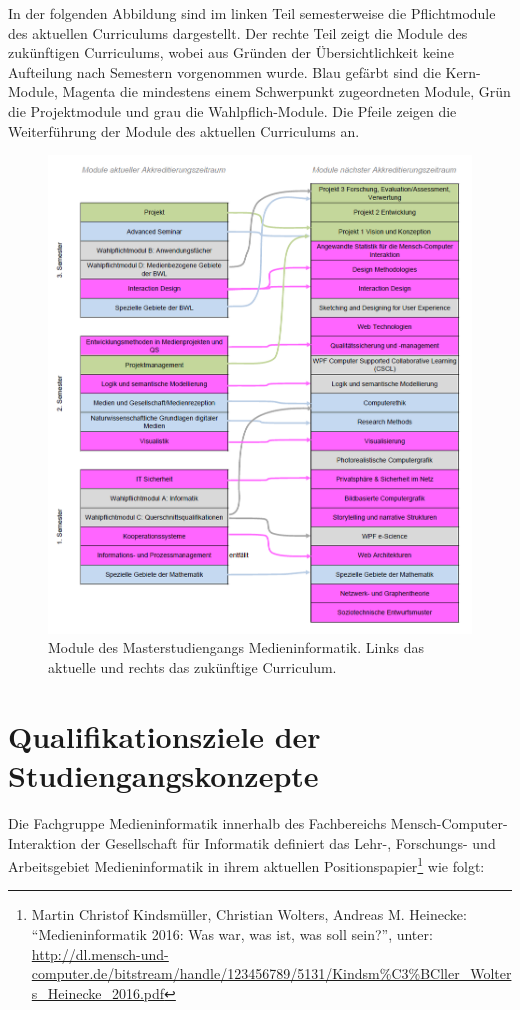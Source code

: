 In der folgenden Abbildung sind im linken Teil semesterweise die
Pflichtmodule des aktuellen Curriculums dargestellt. Der rechte Teil
zeigt die Module des zukünftigen Curriculums, wobei aus Gründen der
Übersichtlichkeit keine Aufteilung nach Semestern vorgenommen wurde.
Blau gefärbt sind die Kern-Module, Magenta die mindestens einem
Schwerpunkt zugeordneten Module, Grün die Projektmodule und grau die
Wahlpflich-Module. Die Pfeile zeigen die Weiterführung der Module des
aktuellen Curriculums an.

\begin{figure}[htbp]
\centering
\includegraphics[width=\columnwidth]{../anhaenge/bilder/ma-mpo3-mpo4.png}
\caption{Module des Masterstudiengangs Medieninformatik. Links das
aktuelle und rechts das zukünftige Curriculum.}
\end{figure}

\chapter{Qualifikationsziele der
Studiengangskonzepte}\label{qualifikationsziele-der-studiengangskonzepte}

Die Fachgruppe Medieninformatik innerhalb des Fachbereichs
Mensch-Computer-Interaktion der Gesellschaft für Informatik definiert
das Lehr-, Forschungs- und Arbeitsgebiet Medieninformatik in ihrem
aktuellen Positionspapier\footnote{Martin Christof Kindsmüller,
  Christian Wolters, Andreas M. Heinecke: ``Medieninformatik 2016: Was
  war, was ist, was soll sein?'', unter:
  \url{http://dl.mensch-und-computer.de/bitstream/handle/123456789/5131/Kindsm\%C3\%BCller\_Wolters\_Heinecke\_2016.pdf}}
wie folgt:

